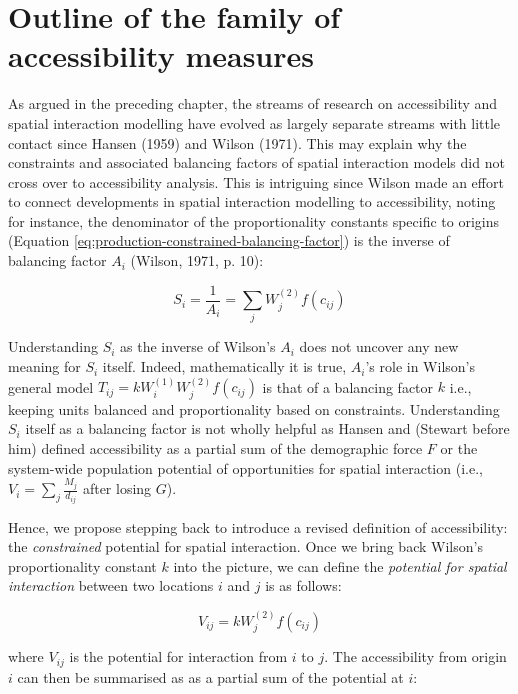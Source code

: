 \documentclass[
11pt, %
oneside, %
english, %
singlespacing, %
]{macthesis} %
\begin{document}
\section{Outline of the family of accessibility measures}\label{outline-of-the-family-of-accessibility-measures}

As argued in the preceding chapter, the streams of research on accessibility and spatial interaction modelling have evolved as largely separate streams with little contact since Hansen (1959) and Wilson (1971). This may explain why the constraints and associated balancing factors of spatial interaction models did not cross over to accessibility analysis. This is intriguing since Wilson made an effort to connect developments in spatial interaction modelling to accessibility, noting for instance, the denominator of the proportionality constants specific to origins (Equation \ref{eq:production-constrained-balancing-factor}) is the inverse of balancing factor \(A_i\) (Wilson, 1971, p. 10):

\begin{equation}
\label{eq:Ai-as-accessibility}
S_i = \frac{1}{A_i} = \sum_j W_j^{(2)} f(c_{ij})
\end{equation} 

Understanding \(S_i\) as the inverse of Wilson's \(A_i\) does not uncover any new meaning for \(S_i\) itself. Indeed, mathematically it is true, \(A_i\)'s role in Wilson's general model \(T_{ij} = k W_i^{(1)} W_j^{(2)} f(c_{ij})\) is that of a balancing factor \(k\) i.e., keeping units balanced and proportionality based on constraints. Understanding \(S_i\) itself as a balancing factor is not wholly helpful as Hansen and (Stewart before him) defined accessibility as a partial sum of the demographic force \(F\) or the system-wide population potential of opportunities for spatial interaction (i.e., \(V_i = \sum_j \frac{M_j}{d_{ij}}\) after losing \(G\)).

Hence, we propose stepping back to introduce a revised definition of accessibility: the \emph{constrained} potential for spatial interaction. Once we bring back Wilson's proportionality constant \(k\) into the picture, we can define the \emph{potential for spatial interaction} between two locations \(i\) and \(j\) is as follows:

\begin{equation}
\label{eq:access-01}
V_{ij} = k W_j^{(2)} f(c_{ij})
\end{equation} 

\noindent where \(V_{ij}\) is the potential for interaction from \(i\) to \(j\). The accessibility from origin \(i\) can then be summarised as as a partial sum of the potential at \(i\):
\end{document}

